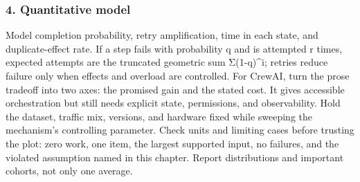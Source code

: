 \subsubsection*{4. Quantitative model}
Model completion probability, retry amplification, time in each state, and duplicate-effect rate. If a step fails with probability q and is attempted r times, expected attempts are the truncated geometric sum Σ(1-q)\textasciicircum{}i; retries reduce failure only when effects and overload are controlled.
For CrewAI, turn the prose tradeoff into two axes: the promised gain and the stated cost. It gives accessible orchestration but still needs explicit state, permissions, and observability. Hold the dataset, traffic mix, versions, and hardware fixed while sweeping the mechanism's controlling parameter.
Check units and limiting cases before trusting the plot: zero work, one item, the largest supported input, no failures, and the violated assumption named in this chapter. Report distributions and important cohorts, not only one average.
